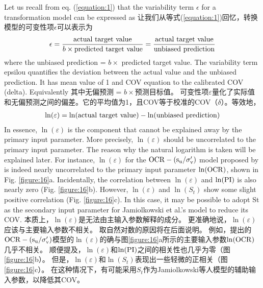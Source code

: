 
\begin{Parallel}{0.60\textwidth}{}
    \ParallelLText
    {
        Let us recall from eq. (\ref{equation:1}) that the variability term $\epsilon$ for a  transformation model can be expressed as
    }
    \ParallelRText
    {
        让我们从等式(\ref{equation:1})回忆，转换模型的可变性项$\epsilon$可以表示为
    }
    \ParallelPar
    \begin{align}
        \epsilon=\dfrac{\rm{actual~target~value}}{b\times{}\rm{predicted~target~value}}=\dfrac{\rm{actual~target~value}}{\rm{unbiased~prediction}}
        \label{equation:2}
    \end{align}
    \ParallelLText
    {
        where the unbiased prediction = $b\times$ predicted target value. The variability term epsilou quantifies the deviation between the actual value and the unbiased prediction. It has mean value of 1 and COV equation to the calibrated COV (delta). Equivalently
    }
    \ParallelRText
    {
        其中无偏预测 = $b\times$预测目标值。 可变性项$\varepsilon$量化了实际值和无偏预测之间的偏差。它的平均值为1，且COV等于校准的COV（$\delta$）。等效地，
    }
    \ParallelPar
    \begin{align}
        \ln(\varepsilon)=\ln(\rm{actual~target~value})-\ln({\rm{unbiased~prediction}})
        \label{equation:3}
    \end{align}
    \ParallelLText
    {
        In essence, $\ln(\varepsilon)$ is the component that cannot be explained away by the primary input parameter. More precisely, $\ln(\varepsilon)$ should be uncorrelated to the primary input parameter. The reason why the natural logarithm is taken will be explained later. For instance, $\ln(\varepsilon)$ for the $\rm{OCR}-(s_u/\sigma_v')$ model proposed by \citet{Jamiolkowski198557} is indeed nearly uncorrelated to the primary input parameter $\ln(\rm{OCR})$, shown in Fig. \ref{figure:16}a. Incidentally, the correlation between $\ln(\varepsilon)$ and $\ln(\rm{PI})$ is also nearly zero (Fig. \ref{figure:16}b). However, $\ln(\varepsilon)$ and $\ln(S_t)$ show some slight positive correlation (Fig. \ref{figure:16}c). In this case, it may be possible to adopt St as the secondary input parameter for Jamiolkowski et al.’s model to reduce its COV.
    }
    \ParallelRText
    {
        本质上，$\ln(\varepsilon)$是无法由主输入参数解释的成分。 更准确地说，$\ln(\varepsilon)$应该与主要输入参数不相关。 取自然对数的原因将在后面说明。 例如，\citet{Jamiolkowski198557}提出的$\rm{OCR}-(s_u/\sigma_v')$模型的$\ln(\varepsilon)$的确与图\ref{figure:16}a所示的主要输入参数$\ln(\rm{OCR})$几乎不相关。 顺便提及，$\ln(\varepsilon)$和$\ln(\rm{PI})$之间的相关性也几乎为零（图\ref{figure:16}b）。 但是，$\ln(\varepsilon)$和$\ln(S_t)$表现出一些轻微的正相关（图\ref{figure:16}c）。 在这种情况下，有可能采用$S_t$作为Jamiolkowski等人模型的辅助输入参数，以降低其COV。
}
\end{Parallel}
